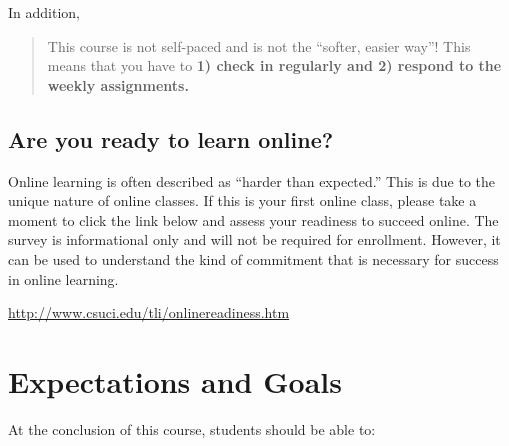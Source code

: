 \documentclass[11pt,]{article}
\begin{document}
In addition,

\begin{quote}
This course is not self-paced and is not the ``softer, easier way''!
This means that you have to \textbf{1) check in regularly and 2) respond
to the weekly assignments.}
\end{quote}

\hypertarget{are-you-ready-to-learn-online}{%
\subsection{Are you ready to learn
online?}\label{are-you-ready-to-learn-online}}

Online learning is often described as ``harder than expected.'' This is
due to the unique nature of online classes. If this is your first online
class, please take a moment to click the link below and assess your
readiness to succeed online. The survey is informational only and will
not be required for enrollment. However, it can be used to understand
the kind of commitment that is necessary for success in online learning.

\url{http://www.csuci.edu/tli/onlinereadiness.htm}

\hypertarget{expectations-and-goals}{%
\section{Expectations and Goals}\label{expectations-and-goals}}

At the conclusion of this course, students should be able to:
\end{document}
